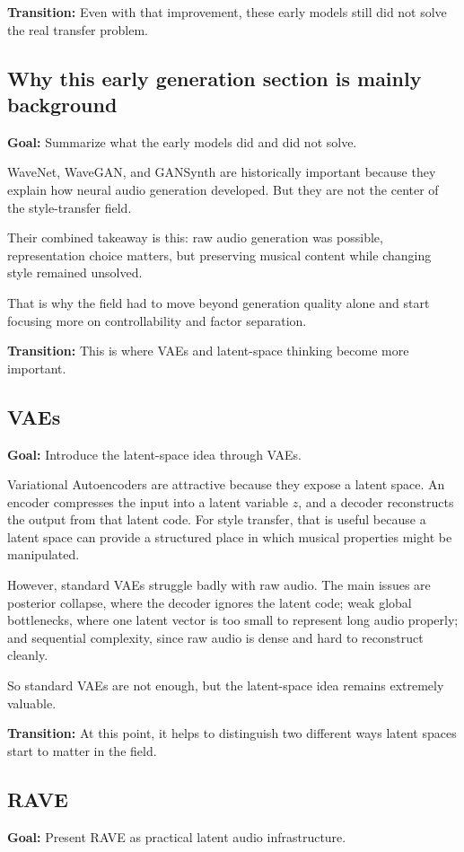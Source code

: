 \documentclass[11pt]{article}
\begin{document}
\textbf{Transition:} Even with that improvement, these early models still did not solve the real transfer problem.

\subsection*{Why this early generation section is mainly background}
\textbf{Goal:} Summarize what the early models did and did not solve.

WaveNet, WaveGAN, and GANSynth are historically important because they explain how neural audio generation developed. But they are not the center of the style-transfer field.

Their combined takeaway is this: raw audio generation was possible, representation choice matters, but preserving musical content while changing style remained unsolved.

That is why the field had to move beyond generation quality alone and start focusing more on controllability and factor separation.

\textbf{Transition:} This is where VAEs and latent-space thinking become more important.

\subsection*{VAEs}
\textbf{Goal:} Introduce the latent-space idea through VAEs.

Variational Autoencoders are attractive because they expose a latent space. An encoder compresses the input into a latent variable \(z\), and a decoder reconstructs the output from that latent code. For style transfer, that is useful because a latent space can provide a structured place in which musical properties might be manipulated.

However, standard VAEs struggle badly with raw audio. The main issues are posterior collapse, where the decoder ignores the latent code; weak global bottlenecks, where one latent vector is too small to represent long audio properly; and sequential complexity, since raw audio is dense and hard to reconstruct cleanly.

So standard VAEs are not enough, but the latent-space idea remains extremely valuable.

\textbf{Transition:} At this point, it helps to distinguish two different ways latent spaces start to matter in the field.

\subsection*{RAVE}
\textbf{Goal:} Present RAVE as practical latent audio infrastructure.
\end{document}
